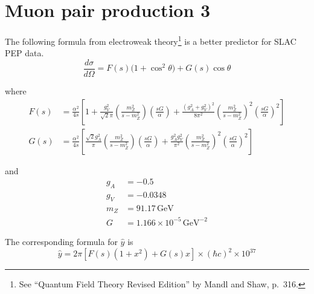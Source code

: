 

\section*{Muon pair production 3}

The following formula from electroweak theory\footnote
{See ``Quantum Field Theory Revised Edition'' by Mandl and Shaw, p.~316.}
is a better predictor for SLAC PEP data.
\begin{equation*}
\frac{d\sigma}{d\Omega}=F(s)\bigl(1+\cos^2\theta\bigr)+G(s)\cos\theta
\end{equation*}

where
\begin{align*}
F(s)&=\frac{\alpha^2}{4s}
\left[
1+\frac{g_V^2}{\sqrt{2}\pi}\left(\frac{m_Z^2}{s-m_Z^2}\right)\left(\frac{sG}{\alpha}\right)
+\frac{(g_A^2+g_V^2)^2}{8\pi^2}\left(\frac{m_Z^2}{s-m_Z^2}\right)^2\left(\frac{sG}{\alpha}\right)^2
\right]
\\
G(s)&=\frac{\alpha^2}{4s}
\left[
\frac{\sqrt{2}g_A^2}{\pi}\left(\frac{m_Z^2}{s-m_Z^2}\right)\left(\frac{sG}{\alpha}\right)
+\frac{g_A^2g_V^2}{\pi^2}\left(\frac{m_Z^2}{s-m_Z^2}\right)^2\left(\frac{sG}{\alpha}\right)^2
\right]
\end{align*}

and
\begin{align*}
g_A&=-0.5
\\
g_V&=-0.0348
\\
m_Z&=91.17\,\text{GeV}
\\
G&=1.166\times10^{-5}\,\text{GeV}^{-2}
\end{align*}

The corresponding formula for $\hat{y}$ is
\begin{equation*}
\hat{y}=2\pi\left[F(s)(1+x^2)+G(s)x\right]\times(\hbar c)^2\times10^{37}
\end{equation*}


